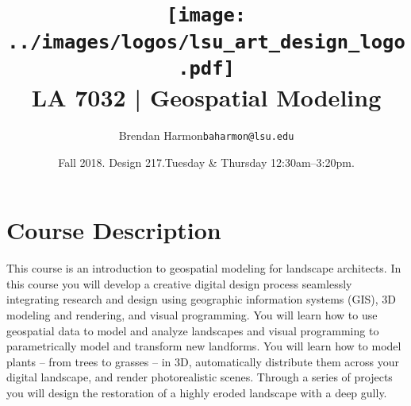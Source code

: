 \documentclass[11pt,article,oneside]{memoir}
\makeatletter
\def\myauthor{Author}
\def\mytitle{Title}
\def\myemail{baharmon@lsu.edu}
\def\myauthor{Brendan Harmon}
\def\mytitle{ \texttt{[image: ../images/logos/lsu\_art\_design\_logo.pdf]} \\[0.1cm] {\normalfont \normalsize LA 7032 |} \Large Geospatial Modeling} %
\newcommand{\globalcolor}[1]{%
  \color{#1}\global\let\default@color\current@color
}
\makeatother
\begin{document}
\setlength\bibitemsep{0.5em}

\setmainfont[Scale=1, Path = fonts/lato/,BoldItalicFont=Lato-RegIta,BoldFont=Lato-Reg,ItalicFont=Lato-LigIta]{Lato-Lig}
\setsansfont[Scale=1, Path = fonts/lato/,BoldItalicFont=Lato-RegIta,BoldFont=Lato-Reg,ItalicFont=Lato-LigIta]{Lato-Lig}
\setmonofont[Mapping=tex-text,Scale=0.8,Path = fonts/inconsolata/]{i}

\def\ind{\hangindent=1 true cm\hangafter=1 \noindent}
\def\labelitemi{$\cdot$}

\title{\LARGE \mytitle}
\author{\Large\myauthor \newline \footnotesize\texttt{\noindent\myemail}}
\date{Fall 2018. Design 217.\newline Tuesday \& Thursday 12:30am--3:20pm.}
\published{\,}


\globalcolor{black}
\vspace*{-10em}
\maketitle
\clearpage



\globalcolor{black}

\vspace*{-10em}
\maketitle

\section{Course Description}

This course is an introduction to 
geospatial modeling for landscape architects.
In this course you will develop a creative digital design process
seamlessly integrating research and design
using geographic information systems (GIS),
3D modeling and rendering, and
visual programming.
You will learn how to use geospatial data
to model and analyze landscapes
and visual programming to
parametrically model and transform new landforms.
You will learn how to model plants -- from trees to grasses -- in 3D,
automatically distribute them across your digital landscape,
and render photorealistic scenes.
Through a series of projects you will design the restoration 
of a highly eroded landscape with a deep gully.\\
\end{document}
